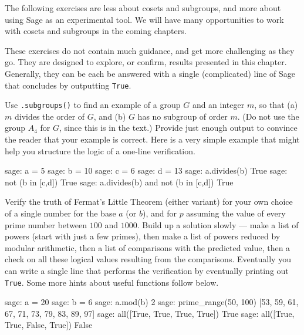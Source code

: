 The following exercises are less about cosets and subgroups, and more about using Sage as an experimental tool.  We will have many opportunities to work with cosets and subgroups in the coming chapters.\par
%
These exercises do not contain much guidance, and get more challenging as they go.  They are designed to explore, or confirm, results presented in this chapter.  Generally, they can be each be answered with a single (complicated) line of Sage that concludes by outputting \verb?True?.
\begin{sageverbatim}\end{sageverbatim}
%
%
Use \verb?.subgroups()? to find an example of a group $G$ and an integer $m$, so that (a) $m$ divides the order of $G$, and (b) $G$ has no subgroup of order $m$.  (Do not use the group $A_4$ for $G$, since this is in the text.)  Provide just enough output to convince the reader that your example is correct.  Here is a very simple example that might help you structure the logic of a one-line verification.
%
\begin{sageexample}
sage: a = 5
sage: b = 10
sage: c = 6
sage: d = 13
sage: a.divides(b)
True
sage: not (b in [c,d])
True
sage: a.divides(b) and not (b in [c,d])
True
\end{sageexample}
%
\begin{sageverbatim}\end{sageverbatim}
%
%
Verify the truth of Fermat's Little Theorem (either variant) for your own choice of a single number for the base $a$ (or $b$), and for $p$ assuming the value of every prime number between $100$ and $1000$.  Build up a solution slowly --- make a list of powers (start with just a few primes), then make a list of powers reduced by modular arithmetic, then a list of comparisons with  the predicted value, then a check on all these logical values resulting from the comparisons.  Eventually you can write a single line that performs the verification by eventually printing out \verb?True?.  Some more hints about useful functions follow below.
%
\begin{sageexample}
sage: a = 20
sage: b = 6
sage: a.mod(b)
2
sage: prime_range(50, 100)
[53, 59, 61, 67, 71, 73, 79, 83, 89, 97]
sage: all([True, True, True, True])
True
sage: all([True, True, False, True])
False
\end{sageexample}
